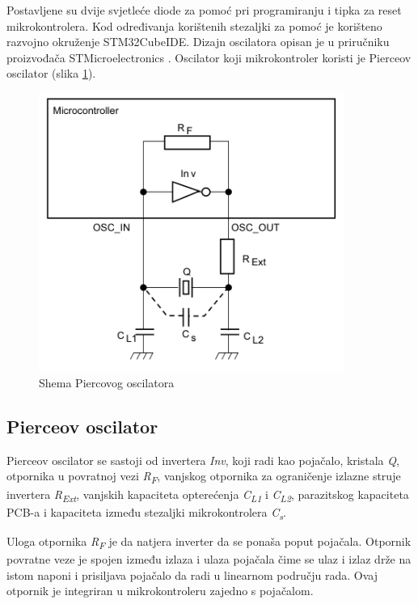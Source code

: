 Postavljene su dvije svjetleće diode za pomoć pri programiranju i tipka za reset mikrokontrolera. Kod određivanja korištenih stezaljki za pomoć je korišteno razvojno okruženje STM32CubeIDE. Dizajn oscilatora opisan je u priručniku proizvođača STMicroelectronics \cite{stmicroelectronics:an2867}. Oscilator koji mikrokontroler koristi je Pierceov oscilator (slika \ref{slk:PIERCE}).
\begin{figure}[hbt]
    \centering
    \includegraphics[width=10cm]{Figures/pierce.PNG}
    \caption{Shema Piercovog oscilatora \cite{stmicroelectronics:an2867}}
    \label{slk:PIERCE}
\end{figure}

\subsection{Pierceov oscilator}
Pierceov oscilator se sastoji od invertera \textit{Inv}, koji radi kao pojačalo, kristala \textit{Q}, otpornika u povratnoj vezi \textit{R\textsubscript{F}}, vanjskog otpornika za ograničenje izlazne struje invertera \textit{R\textsubscript{Ext}}, vanjskih kapaciteta opterećenja \textit{C\textsubscript{L1}} i \textit{C\textsubscript{L2}}, parazitskog kapaciteta PCB-a i kapaciteta između stezaljki mikrokontrolera \textit{C\textsubscript{s}}.

Uloga otpornika \textit{R\textsubscript{F}} je da natjera inverter da se ponaša poput pojačala. Otpornik povratne veze je spojen između izlaza i ulaza pojačala čime se ulaz i izlaz drže na istom naponi i prisiljava pojačalo da radi u linearnom području rada. Ovaj otpornik je integriran u mikrokontroleru zajedno s pojačalom.

